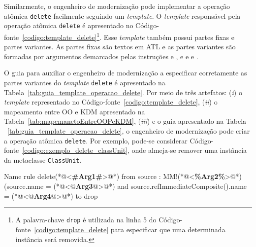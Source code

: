 Similarmente, o engenheiro de modernização pode implementar a operação atômica \texttt{delete} facilmente seguindo um \textit{template}. O \textit{template} responsável pela operação atômica \texttt{delete} é apresentado no Código-fonte~\ref{codigo:template_delete}\footnote{A palavra-chave \texttt{drop} é utilizada na linha 5 do Código-fonte~\ref{codigo:template_delete} para especificar que uma determinada instância será removida.}. Esse \textit{template} também possui partes fixas e partes variantes. As partes fixas são textos em ATL e as partes variantes são formadas por argumentos demarcados pelas instruções \aspas{\textbf{<\#}} e \aspas{\textbf{\#>}}, \aspas{\textbf{<\%}} e \aspas{\textbf{\%>}} e  e . 

O guia para auxiliar o engenheiro de modernização a especificar corretamente as partes variantes do \textit{template} \texttt{delete} é apresentado na Tabela~\ref{tab:guia_template_operacao_delete}. Por meio de três artefatos: (\textit{i}) o \textit{template} representado no Código-fonte~\ref{codigo:template_delete}, (\textit{ii}) o mapeamento entre OO e KDM apresentado na Tabela~\ref{tab:mapemanetoEntreOOPeKDM}, (\textit{iii}) e o guia apresentado na Tabela ~\ref{tab:guia_template_operacao_delete}, o engenheiro de modernização pode criar a operação atômica \texttt{delete}. Por exemplo, pode-se considerar Código-fonte~\ref{codigo:exemplo_delete_classUnit}, onde almeja-se remover uma instância da metaclasse \texttt{ClassUnit}. 

\begin{codigo}[caption={[\textit{Template} ATL para realizar a operação atômica \texttt{delete}.] \textit{Template} ATL para realizar a operação atômica \texttt{delete}.},escapeinside={(*@}{@*)}, basicstyle=\footnotesize, label={codigo:template_delete}, language=ATL]{Name}
rule delete(*@<\textbf{\#Arg1\#}>@*) {
  from
      source : MM!(*@<\textbf{\%Arg2\%}>@*) (source.name = (*@<\textbf{$@$Arg3$@$}>@*) and source.refImmediateComposite().name = (*@<\textbf{$@$Arg4$@$}>@*)
  to
      drop
}
\end{codigo}

